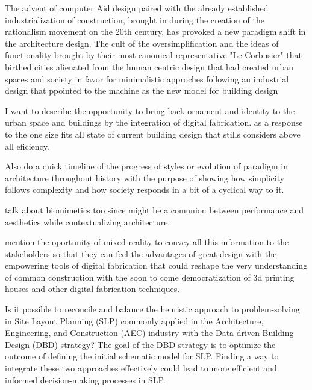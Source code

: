 

The advent of computer Aid design paired with the already established industrialization of construction, brought in during the creation of the rationalism movement on the 20th century, has provoked a new paradigm shift in the architecture design. The cult of the oversimplification and the ideas of functionality brought by their most canonical representative "Le Corbusier" that birthed cities alienated from the human centric design that had created urban spaces and society \cite{Stacbond2020} in favor for minimalistic approches following an industrial design that ppointed to the machine as the new model for building design \cite{Economakis2023}

I want to describe the opportunity to bring back ornament and identity to the urban space and buildings by the integration of digital fabrication. as a response to the one size fits all state of current building design that stills considers above all eficiency.

Also do a quick timeline of the progress of styles or evolution of paradigm in architecture throughout history with the purpose of showing how simplicity follows complexity and how society responds in a bit of a cyclical way to it.

talk about biomimetics too since might be a comunion between performance and aesthetics while contextualizing architecture.

mention the oportunity of mixed reality to convey all this information to the stakeholders so that they can feel the advantages of great design with the empowering tools of digital fabrication that could reshape the very understanding of common construction with the soon to come democratization of 3d printing houses and other digital fabrication techniques.


Is it possible to reconcile and balance the heuristic approach to problem-solving in Site Layout Planning (SLP) commonly applied in the Architecture, Engineering, and Construction (AEC) industry with the Data-driven Building Design (DBD) strategy? The goal of the DBD strategy is to optimize the outcome of defining the initial schematic model for SLP. Finding a way to integrate these two approaches effectively could lead to more efficient and informed decision-making processes in SLP.

